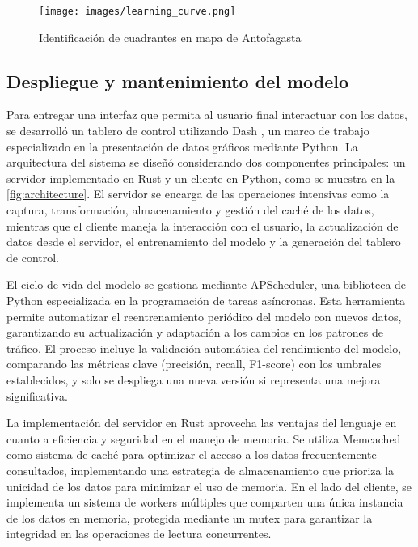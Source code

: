 \documentclass[12pt]{article}
\begin{document}
\begin{figure}[H]
    \centering
    \texttt{[image: images/learning\_curve.png]}
    \caption{Identificación de cuadrantes en mapa de Antofagasta}
    \label{fig:learning_curve}
\end{figure}


\subsection{Despliegue y mantenimiento del modelo}

Para entregar una interfaz que permita al usuario final interactuar con los datos, se desarrolló un tablero de control utilizando Dash \parencite{dashboard2024}, un marco de trabajo especializado en la presentación de datos gráficos mediante Python. La arquitectura del sistema se diseñó considerando dos componentes principales: un servidor implementado en Rust y un cliente en Python, como se muestra en la \autoref{fig:architecture}. El servidor se encarga de las operaciones intensivas como la captura, transformación, almacenamiento y gestión del caché de los datos, mientras que el cliente maneja la interacción con el usuario, la actualización de datos desde el servidor, el entrenamiento del modelo y la generación del tablero de control.

El ciclo de vida del modelo se gestiona mediante APScheduler, una biblioteca de Python especializada en la programación de tareas asíncronas. Esta herramienta permite automatizar el reentrenamiento periódico del modelo con nuevos datos, garantizando su actualización y adaptación a los cambios en los patrones de tráfico. El proceso incluye la validación automática del rendimiento del modelo, comparando las métricas clave (precisión, recall, F1-score) con los umbrales establecidos, y solo se despliega una nueva versión si representa una mejora significativa.

La implementación del servidor en Rust aprovecha las ventajas del lenguaje en cuanto a eficiencia y seguridad en el manejo de memoria. Se utiliza Memcached como sistema de caché para optimizar el acceso a los datos frecuentemente consultados, implementando una estrategia de almacenamiento que prioriza la unicidad de los datos para minimizar el uso de memoria. En el lado del cliente, se implementa un sistema de workers múltiples que comparten una única instancia de los datos en memoria, protegida mediante un mutex para garantizar la integridad en las operaciones de lectura concurrentes.
\end{document}
